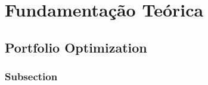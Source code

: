 \chapter{Fundamentação Teórica}

\section{Portfolio Optimization}

\lipsum[1-4]

\subsection{Subsection}

\lipsum[2-4]